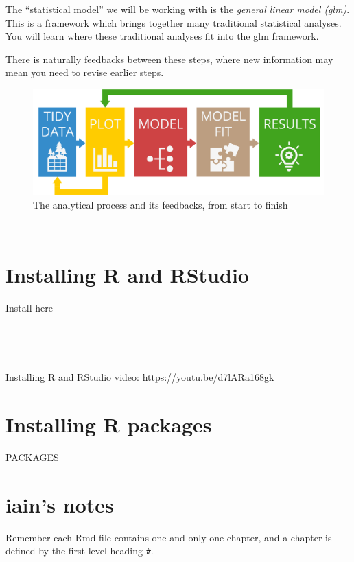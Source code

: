 \documentclass[
]{book}
\begin{document}
The ``statistical model'' we will be working with is the
\emph{general linear model (glm)}. This is a framework which brings together
many traditional statistical analyses. You will learn where these traditional
analyses fit into the glm framework.

There is naturally feedbacks between these steps, where new information may
mean you need to revise earlier steps.\\
\hspace*{0.333em}

\begin{figure}
\centering
\includegraphics{Process.png}
\caption{The analytical process and its feedbacks, from start to finish}
\end{figure}

~

\hypertarget{installing-r-and-rstudio}{%
\section{Installing R and RStudio}\label{installing-r-and-rstudio}}

Install here

~

~

Installing R and RStudio video: \url{https://youtu.be/d7lARa168gk}
~

\hypertarget{installing-r-packages}{%
\section{Installing R packages}\label{installing-r-packages}}

PACKAGES

\hypertarget{iains-notes}{%
\section{iain's notes}\label{iains-notes}}

Remember each Rmd file contains one and only one chapter, and a chapter is defined by the first-level heading \texttt{\#}.
\end{document}

